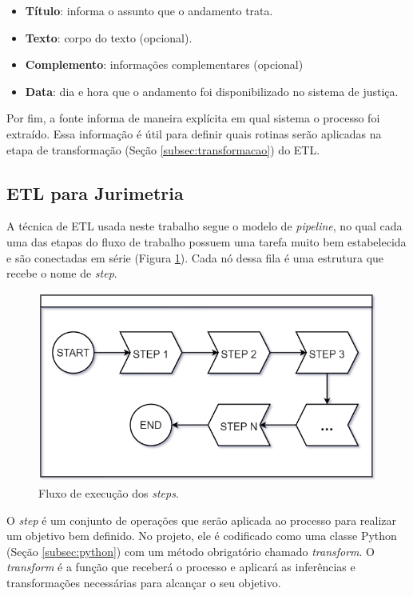 \begin{itemize}
    \item \textbf{Título}: informa o assunto que o andamento trata.
    \item \textbf{Texto}: corpo do texto (opcional).
    \item \textbf{Complemento}: informações complementares (opcional)
    \item \textbf{Data}: dia e hora que o andamento foi disponibilizado no sistema de justiça.
\end{itemize}

Por fim, a fonte informa de maneira explícita em qual sistema o processo foi extraído. Essa informação é útil para definir quais rotinas serão aplicadas na etapa de transformação (Seção \ref{subsec:transformacao}) do ETL.


\subsection{ETL para Jurimetria}
\label{jurimetria}

A técnica de ETL usada neste trabalho segue o modelo de \textit{pipeline}, no qual cada uma das etapas do fluxo de trabalho possuem uma tarefa muito bem estabelecida e são conectadas em série (Figura \ref{fig:stepsFlow}). Cada nó dessa fila é uma estrutura que recebe o nome de \textit{step}.

\begin{figure}[ht]
\centering
\includegraphics[width=1\textwidth]{imagens/steps-flow.png}
\caption{Fluxo de execução dos \textit{steps}.}
\label{fig:stepsFlow}
\end{figure}

O \textit{step} é um conjunto de operações que serão aplicada ao processo para realizar um objetivo bem definido. No projeto, ele é codificado como uma classe Python (Seção \ref{subsec:python}) com um método obrigatório chamado \textit{transform}. O \textit{transform} é a função que receberá o processo e aplicará as inferências e transformações necessárias para alcançar o seu objetivo.

